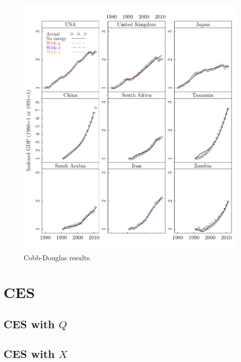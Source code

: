 \documentclass[preprint,authoryear,12pt]{elsarticle}\usepackage{graphicx, color}
\makeatletter
\def\maxwidth{ %
  \ifdim\Gin@nat@width>\linewidth
    \linewidth
  \else
    \Gin@nat@width
  \fi
}
\newenvironment{knitrout}{}{} %
\makeatother
\begin{document}
\begin{knitrout}
\color{fgcolor}\begin{figure}[H]

\includegraphics[width=\maxwidth]{figure/CD_GDP_Lattice_Graph} \caption[Cobb-Douglas results]{Cobb-Douglas results.\label{fig:CD_GDP_Lattice_Graph}}
\end{figure}


\end{knitrout}


\section{CES}




\subsection{CES with $Q$}






\subsection{CES with $X$}
\end{document}
